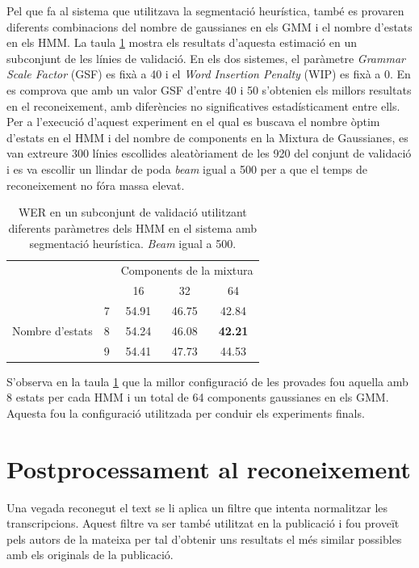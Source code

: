 Pel que fa al sistema que utilitzava la segmentació heurística, també es provaren diferents combinacions del nombre de gaussianes en els GMM i el nombre d'estats en els HMM. La taula \ref{tab:estimacio_parametres_HMM} mostra els resultats d'aquesta estimació en un subconjunt de les línies de validació. En els dos sistemes, el paràmetre \emph{Grammar Scale Factor} (GSF) es fixà a 40 i el \emph{Word Insertion Penalty} (WIP) es fixà a 0. En \cite{espana2011improving} es comprova que amb un valor GSF d'entre 40 i 50 s'obtenien els millors resultats en el reconeixement, amb diferències no significatives estadísticament entre ells. Per a l'execució d'aquest experiment en el qual es buscava el nombre òptim d'estats en el HMM i del nombre de components en la Mixtura de Gaussianes, es van extreure 300 línies escollides aleatòriament de les 920 del conjunt de validació i es va escollir un llindar de poda \emph{beam} igual a 500 per a que el temps de reconeixement no fóra massa elevat.\\

\begin{table}
\centering
\begin{tabular}{cc|c|c|c|}
\cline{3-5}
& & \multicolumn{3}{c|}{Components de la mixtura}\\
\cline{3-5}
& & 16 & 32 & 64 \\ 
\cline{1-5}
\multicolumn{1}{|c|}{\multirow{3}{*}{Nombre d'estats}} & 7 & 54.91 & 46.75 & 42.84\\
\cline{2-5}
\multicolumn{1}{|c|}{} & 8 & 54.24 & 46.08 & \textbf{42.21}\\
\cline{2-5}
\multicolumn{1}{|c|}{} & 9 & 54.41 & 47.73 & 44.53\\
\cline{1-5}
\end{tabular}
\caption{WER en un subconjunt de validació utilitzant diferents paràmetres dels HMM en el sistema amb segmentació heurística. \emph{Beam} igual a 500.}\label{tab:estimacio_parametres_HMM}
\end{table}

S'observa en la taula \ref{tab:estimacio_parametres_HMM} que  la millor configuració de les provades fou aquella amb 8 estats per cada HMM i un total de 64 components gaussianes en els GMM. Aquesta fou la configuració utilitzada per conduir els experiments finals.

\section{Postprocessament al reconeixement}\label{sec:exper_filtre}
Una vegada reconegut el text se li aplica un filtre que intenta normalitzar les transcripcions. Aquest filtre va ser també utilitzat en la publicació \cite{espana2011improving} i fou proveït pels autors de la mateixa per tal d'obtenir uns resultats el més similar possibles amb els originals de la publicació.\\

